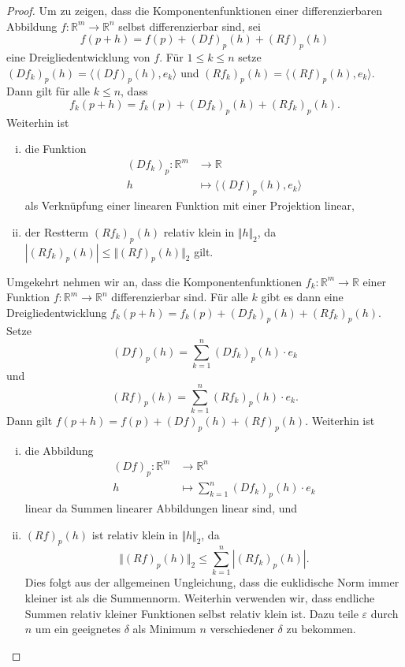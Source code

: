 \documentclass[../main.tex]{subfiles}
\begin{document}
\begin{proof}
  Um zu zeigen, dass die Komponentenfunktionen einer
  differenzierbaren Abbildung $f \colon \mathbb{R}^m \to \mathbb{R}^n$
  selbst differenzierbar sind, sei
  \[
    f(p + h) = f(p) + {(Df)}_p(h) + {(Rf)}_p(h)
  \]
  eine Dreigliedentwicklung von $f$.
  Für $1 \leq k \leq n$ 
  setze ${(Df_k)}_p(h) = \langle {(Df)}_p(h), e_k \rangle$ 
  und ${(Rf_k)}_p(h) = \langle {(Rf)}_p(h), e_k \rangle$.
  Dann gilt für alle $k \leq n$, dass
  \[
    f_k(p + h) = f_k(p) + {(Df_k)}_p(h) + {(Rf_k)}_p(h).
  \]
  Weiterhin ist
  \begin{enumerate}[(i)]
    \item die Funktion
      \begin{align*}
        {(Df_k)}_p \colon \mathbb{R}^m & \to \mathbb{R} \\
        h & \mapsto \langle {(Df)}_p(h), e_k \rangle
      \end{align*}
      als Verknüpfung einer linearen Funktion mit einer Projektion
      linear,
    \item der Restterm ${(Rf_k)}_p(h)$ relativ klein
      in $\Vert h \Vert_2$, da 
      \(
        |{(Rf_k)}_p(h)| \leq \Vert {(Rf)}_p(h) \Vert_2
      \)
      gilt.
  \end{enumerate}

  Umgekehrt nehmen wir an, dass die Komponentenfunktionen
  $f_k \colon \mathbb{R}^m \to \mathbb{R}$
  einer Funktion $f \colon \mathbb{R}^m \to \mathbb{R}^n$ 
  differenzierbar sind.
  Für alle $k$ gibt es dann eine Dreigliedentwicklung
  \(
    f_k(p + h) = f_k(p) + {(Df_k)}_p(h) + {(Rf_k)}_p(h).
  \)
  Setze
  \[
    {(Df)}_p(h) = \sum_{k=1}^{n} {(Df_k)}_p(h) \cdot e_k
  \]
  und
  \[
    {(Rf)}_p(h) = \sum_{k=1}^{n} {(Rf_k)}_p(h) \cdot e_k.
  \]
  Dann gilt
  \(
    f(p + h) = f(p) + {(Df)}_p(h) + {(Rf)}_p(h).
  \)
  Weiterhin ist
  \begin{enumerate}[(i)]
    \item die Abbildung
      \begin{align*}
        {(Df)}_p \colon \mathbb{R}^m & \to \mathbb{R}^n \\
        h & \mapsto \sum_{k=1}^{n} {(Df_k)}_p(h) \cdot e_k
      \end{align*}
      linear da Summen linearer Abbildungen linear sind, und
    \item ${(Rf)}_p(h)$ ist relativ klein in $\Vert h \Vert_2$,
      da
      \[
        \Vert {(Rf)}_p(h) \Vert_2 \leq \sum_{k=1}^{n} |{(Rf_k)}_p(h)|.
      \]
      Dies folgt aus der allgemeinen Ungleichung, dass
      die euklidische Norm immer kleiner ist als die Summennorm.
      Weiterhin verwenden wir, dass endliche Summen
      relativ kleiner Funktionen selbst relativ klein ist.
      Dazu teile $\varepsilon$ durch $n$ um ein geeignetes
      $\delta$ als Minimum $n$ verschiedener $\delta$ zu bekommen.
      \qedhere
  \end{enumerate}
\end{proof}
\end{document}
